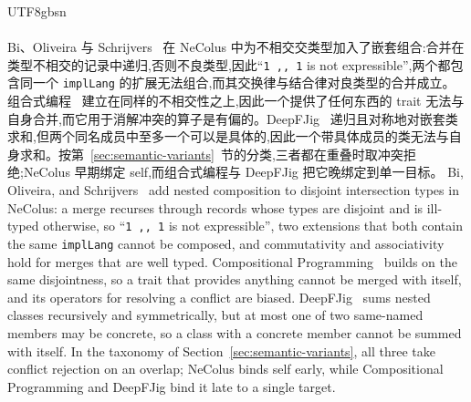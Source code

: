 \begin{CJK*}{UTF8}{gbsn}
\paragraph{}
\ifPaperChinese
Bi、Oliveira 与 Schrijvers~\cite{bi2018-nested-composition} 在 NeColus 中为不相交交类型加入了嵌套组合:合并在类型不相交的记录中递归,否则不良类型,因此“\texttt{1 ,{}, 1} is not expressible”,两个都包含同一个 \texttt{implLang} 的扩展无法组合,而其交换律与结合律对良类型的合并成立。组合式编程~\cite{zhang2021-compositional-programming} 建立在同样的不相交性之上,因此一个提供了任何东西的 trait 无法与自身合并,而它用于消解冲突的算子是有偏的。DeepFJig~\cite{corradi2012-deepfjig} 递归且对称地对嵌套类求和,但两个同名成员中至多一个可以是具体的,因此一个带具体成员的类无法与自身求和。按第~\ref{sec:semantic-variants}~节的分类,三者都在重叠时取冲突拒绝;NeColus 早期绑定 self,而组合式编程与 DeepFJig 把它晚绑定到单一目标。
\else
Bi, Oliveira, and Schrijvers~\cite{bi2018-nested-composition} add
nested composition to disjoint intersection types in NeColus: a merge
recurses through records whose types are disjoint and is ill-typed
otherwise, so ``\texttt{1 ,{}, 1} is not expressible'', two extensions
that both contain the same \texttt{implLang} cannot be composed, and
commutativity and associativity hold for merges that are well typed.
Compositional Programming~\cite{zhang2021-compositional-programming}
builds on the same disjointness, so a trait that provides anything
cannot be merged with itself, and its operators for resolving a
conflict are biased.
DeepFJig~\cite{corradi2012-deepfjig} sums nested classes recursively
and symmetrically, but at most one of two same-named members may be
concrete, so a class with a concrete member cannot be summed with
itself.
In the taxonomy of Section~\ref{sec:semantic-variants}, all three take conflict rejection on an
overlap; NeColus binds self early, while Compositional Programming and DeepFJig bind it late to a
single target.
\fi


\end{CJK*}
